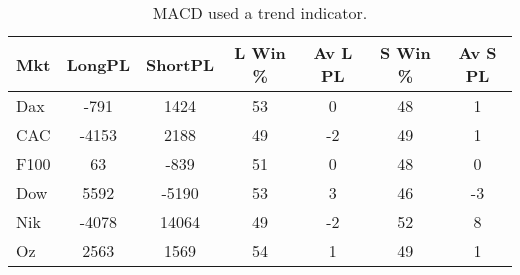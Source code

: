 \begin{table}[ht]
\centering
\caption[MACD as Trend Indicator]{MACD used a trend indicator.} 
\label{tab:mac_trend_results}
\begin{tabular}{lcccccc}
  \toprule Mkt & LongPL & ShortPL & L Win \% & Av L PL & S Win \% & Av S PL \\ 
  \midrule Dax & -791 & 1424 & 53 & 0 & 48 & 1 \\ 
  CAC & -4153 & 2188 & 49 & -2 & 49 & 1 \\ 
  F100 & 63 & -839 & 51 & 0 & 48 & 0 \\ 
  Dow & 5592 & -5190 & 53 & 3 & 46 & -3 \\ 
  Nik & -4078 & 14064 & 49 & -2 & 52 & 8 \\ 
  Oz & 2563 & 1569 & 54 & 1 & 49 & 1 \\ 
   \bottomrule \end{tabular}
\end{table}
